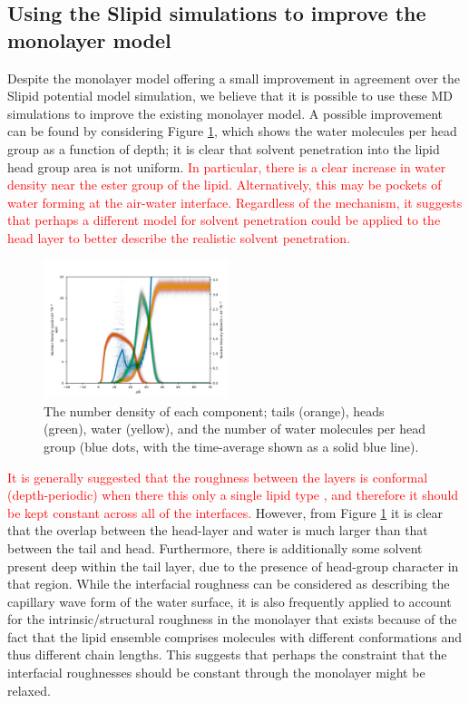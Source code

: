 \documentclass[amsmath,amssymb,twocolumn,superscriptaddress]{revtex4-1}
\begin{document}
\subsection{Using the Slipid simulations to improve the monolayer model}
Despite the monolayer model offering a small improvement in agreement over
the Slipid potential model simulation, we believe that it is possible to use
these MD simulations to improve the existing monolayer model.
A possible improvement can be found by considering Figure \ref{fig:nb},
which shows the water molecules per head group as a function
of depth; it is clear that solvent penetration into the lipid head group
area is not uniform.
\textcolor{red}{In particular, there is a clear increase in water density near the ester
group of the lipid.
Alternatively, this may be pockets of water forming at the air-water interface.
Regardless of the mechanism, it suggests that perhaps a different model
for solvent penetration could be applied to the head layer to better
describe the realistic solvent penetration.}
%
\begin{figure}
\centering
  \includegraphics[width=0.48\textwidth]{number_density}
  \caption{The number density of each component; tails (orange), heads
  (green), water (yellow), and the number of water molecules per head
  group (blue dots, with the time-average shown as a solid blue line).}
  \label{fig:nb}
\end{figure}
%

\textcolor{red}{It is generally suggested that the roughness between the layers is conformal
(depth-periodic) \cite{kozhevnikov_general_2012} when there this only a
single lipid type \cite{campbell_structure_2018}, and therefore it should
be kept constant across all of the interfaces.}
However, from Figure \ref{fig:nb} it is clear that the overlap between the
head-layer and water is much larger than that between the tail and head.
Furthermore, there is additionally some solvent present deep within the tail
layer, due to the presence of head-group character in that region.
While the interfacial roughness can be considered as describing the capillary
wave form of the water surface, it is also frequently applied to account
for the intrinsic/structural roughness in the monolayer that exists because
of the fact that the lipid ensemble comprises molecules with different
conformations and thus different chain lengths.
This suggests that perhaps the constraint that the interfacial roughnesses
should be constant through the monolayer might be relaxed.
\end{document}
